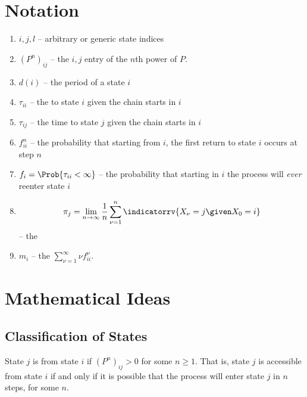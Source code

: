 \documentclass[12pt]{article}
\begin{document}
\hr

\section*{Notation}
\begin{enumerate}
    \item
        \( i, j, l \) -- arbitrary or generic state indices
    \item
        \( (P^n)_{ij} \) -- the \( i,j \) entry of the \( n \)th power
        of \( P \).
    \item
        \( d(i) \) -- the period of a state \( i \)
    \item
        \( \tau_{ii} \) -- the  to state \( i \) given
        the chain starts in \( i \)
    \item
        \( \tau_{ij} \) -- the time to state \( j \) given the chain
        starts in \( i \)
    \item
        \( f^n_{ii} \) -- the probability that starting from \( i \),
        the first return to state \( i \) occurs at step \( n \)
    \item
        \( f_i = \Prob{\tau_{ii} < \infty} \) -- the probability that
        starting in \( i \) the process will \emph{ever} reenter state \(
        i \)
    \item
        \[
            \pi_j = \lim_{n \to \infty} \frac{1}{n} \sum\limits_{\nu=1}^n
            \indicatorrv{X_{\nu}= j \given X_0 = i}
        \] -- the 
    \item
        \( m_i \) -- the  \( \sum_{\nu=1}^\infty
        \nu f^\nu_{ii} \).
\end{enumerate}

\section*{Mathematical Ideas}

\subsection*{Classification of States}

\begin{definition}
    State \( j \) is  from state \( i \) if \( (P^{n})_
    {ij} > 0 \) for some \( n \ge 1 \).  That is, state \( j \) is
    accessible from state \( i \) if and only if it is possible that the
    process will enter state \( j \) in \( n \) steps, for some \( n \).
\end{definition}
\end{document}
